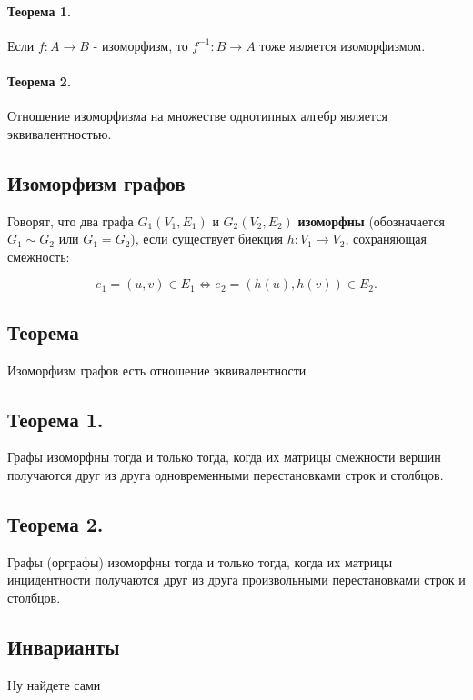 {\paragraph{Теорема 1.} Если $f : A \to B$ - изоморфизм, то $f^{-1} : B \to A$ тоже является изоморфизмом.

\paragraph{Теорема 2.} Отношение изоморфизма на множестве однотипных алгебр является эквивалентностью.

\subsection*{Изоморфизм графов}

Говорят, что два графа $G_1(V_1, E_1)$ и $G_2(V_2, E_2)$ \textbf{изоморфны} (обозначается $G_1 \sim G_2$ или $G_1 = G_2$), если существует биекция $h : V_1 \to V_2$, сохраняющая смежность:


\[
e_1 = (u, v) \in E_1 \iff e_2 = (h(u), h(v)) \in E_2.
\]

\subsection*{Теорема}
Изоморфизм графов есть отношение эквивалентности

\subsection*{Теорема 1.}
Графы изоморфны тогда и только тогда, когда их матрицы смежности вершин получаются друг из друга одновременными перестановками строк и столбцов.

\subsection*{Теорема 2.}
Графы (орграфы) изоморфны тогда и только тогда, когда их матрицы инцидентности получаются друг из друга произвольными перестановками строк и столбцов.

\subsection*{Инварианты}
Ну найдете сами


    \newpage
}
